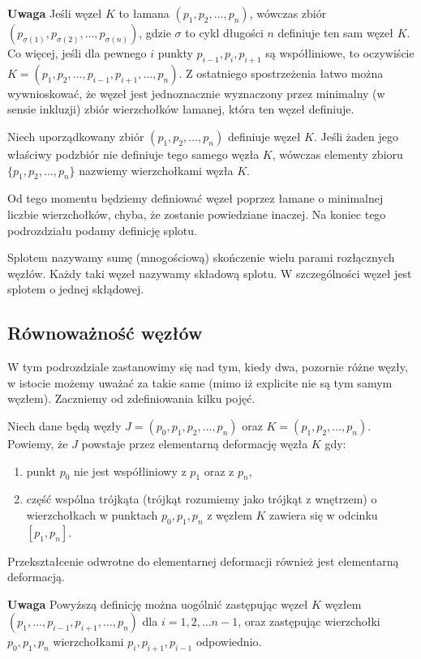 \textbf{Uwaga} Jeśli węzeł $K$ to łamana $(p_1, p_2, \ldots, p_n)$, wówczas zbiór $(p_{\sigma(1)}, p_{\sigma(2)},\ldots, p_{\sigma(n)})$, gdzie $\sigma$ to cykl długości $n$
definiuje ten sam węzeł $K$.
Co więcej, jeśli dla pewnego $i$ punkty $p_{i-1}, p_i, p_{i+1}$ są współliniowe, to oczywiście $K = (p_1, p_2, \ldots, p_{i-1}, p_{i+1}, \ldots, p_n)$. Z ostatniego spostrzeżenia łatwo
można wywnioskować, że węzeł jest jednoznacznie wyznaczony przez minimalny (w sensie inkluzji) zbiór wierzchołków łamanej, która ten węzeł definiuje. 

\begin{definicja}
 Niech uporządkowany zbiór $(p_1, p_2,\ldots, p_n)$ definiuje węzeł $K$. Jeśli żaden jego właściwy podzbiór nie definiuje tego samego węzła $K$, wówczas elementy zbioru $\lbrace p_1, p_2, \ldots, p_n\rbrace$
 nazwiemy wierzchołkami węzła $K$.
\end{definicja}

Od tego momentu będziemy definiować węzeł poprzez łamane o minimalnej liczbie wierzchołków, chyba, że zostanie powiedziane inaczej. Na koniec tego podrozdziału podamy definicję splotu.

\begin{definicja}
 Splotem nazywamy sumę (mnogościową) skończenie wielu parami rozłącznych węzłów. Każdy taki węzeł nazywamy składową splotu. W szczególności węzeł jest splotem o jednej skłądowej. 
\end{definicja}

\subsection{Równoważność węzłów}
W tym podrozdziale zastanowimy się nad tym, kiedy dwa, pozornie różne węzły, w istocie możemy uważać za takie same (mimo iż explicite nie są tym samym węzłem). 
Zaczniemy od zdefiniowania kilku pojęć.

\begin{definicja}
\label{elementarne_p}
 Niech dane będą węzły $J = (p_0, p_1, p_2, \ldots, p_n)$ oraz $K = (p_1, p_2, \ldots, p_n)$. 
 Powiemy, że $J$ powstaje przez elementarną deformację węzła $K$ gdy: 
 \begin{enumerate}
  \item punkt $p_0$ nie jest współliniowy z $p_{1}$ oraz z $p_{n}$,
  \item część wspólna trójkąta (trójkąt rozumiemy jako trójkąt z wnętrzem) o wierzchołkach w punktach $p_0, p_1, p_n$ z węzłem $K$ zawiera się w odcinku $[p_1, p_n]$.
 \end{enumerate}
 Przekształcenie odwrotne do elementarnej deformacji również jest elementarną deformacją.
\end{definicja}
\textbf{Uwaga} Powyższą definicję można uogólnić zastępując węzeł $K$ węzłem $(p_1,\ldots, p_{i-1},p_{i+1}, \ldots, p_n)$ dla $i = 1,2,\ldots n-1$, oraz zastępując wierzchołki
$p_0, p_1, p_n$ wierzchołkami $p_i, p_{i+1}, p_{i-1}$ odpowiednio.

